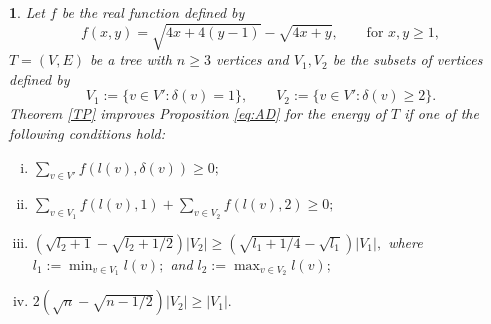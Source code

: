 \documentclass[a4paper]{article}
\newcommand{\abs}[1]{\left\lvert#1\right\rvert}
\theoremstyle{plain}
\newtheorem{theorem}{\protect\thmaname}
\renewcommand{\thmaname}{Theorem}%
\renewcommand{\thmaname}{Teorema}%
\begin{document}
\begin{theorem}
    Let \(f\) be the real function defined by
    \[
        f(x,y) = \sqrt{4x + 4(y-1)} - \sqrt{4x + y}, \qquad \mbox{for } x, y \geq 1,
    \]
    \(T = (V,E)\) be a tree with \(n \geq 3\) vertices and \(V_1, V_2\) be the subsets of vertices defined by
    \[
        V_1 := \{v \in V' : \delta(v) = 1\}, \qquad V_2 := \{v \in V' : \delta(v) \geq 2\}.
    \]
    Theorem \ref{TP} improves Proposition \ref{eq:AD} for the energy of \(T\) if one of the following conditions hold:
    \begin{enumerate}[i)]
        \item \(\sum_{v \in V'} f(l(v),\delta(v)) \geq 0;\)
        \item \(\sum_{v \in V_1} f(l(v),1) + \sum_{v \in V_2} f(l(v),2) \geq 0;\)
        \item \(\left(\sqrt{l_2 + 1} - \sqrt{l_2 + 1/2}\right)\abs{V_2} \geq \left(\sqrt{l_1 + 1/4} - \sqrt{l_1}\right)\abs{V_1},\) where \(l_1 := \min_{v \in V_1} l(v);\) and \(l_2 := \max_{v \in V_2} l(v);\)
        \item \(2\left(\sqrt{n} - \sqrt{n-1/2}\right)\abs{V_2} \geq \abs{V_1}.\)
    \end{enumerate}
    
\end{theorem}
\end{document}
